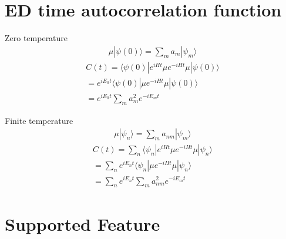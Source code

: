 \documentclass[a4paper,11pt]{ctexart}
\begin{document}
\section{ED time autocorrelation function}
Zero temperature
\begin{align}
    \mu | \psi(0) \rangle  =  \sum_m a_m | \psi_m \rangle
\end{align} 
\begin{align}
    C(t) =  \langle \psi(0) | e^{iHt} \mu e^{-iHt} \mu | \psi(0) \rangle \\
    =  e^{iE_0t} \langle \psi(0) | \mu e^{-iHt} \mu | \psi(0) \rangle \\
    =  e^{iE_0t} \sum_m a_m^2 e^{-iE_mt}
\end{align} 

Finite temperature
\begin{align}
    \mu | \psi_n \rangle  =  \sum_m a_{nm} | \psi_m \rangle
\end{align} 
\begin{align}
    C(t) = \sum_n \langle \psi_n | e^{iHt} \mu e^{-iHt} \mu | \psi_n \rangle \\
    =  \sum_n e^{iE_nt} \langle \psi_n | \mu e^{-iHt} \mu | \psi_n \rangle \\
    =  \sum_n e^{iE_nt} \sum_m a_{nm}^2 e^{-iE_mt}
\end{align} 


\section{Supported Feature}
\end{document}
